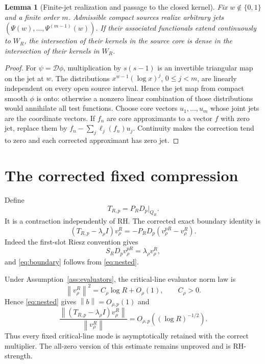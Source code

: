 \documentclass[11pt]{article}
\newtheorem{lemma}[theorem]{Lemma}
\theoremstyle{remark}
\newcommand{\norm}[1]{\left\lVert #1\right\rVert}
\begin{document}
\begin{lemma}[Finite-jet realization and passage to the closed kernel]\label{lem:jet-density}
Fix $w\notin\{0,1\}$ and a finite order $m$. Admissible compact sources
realize arbitrary jets $(\Psi(w),\ldots,\Psi^{(m-1)}(w))$.
If their associated functionals extend continuously to $W_R$, the
intersection of their kernels in the source core is dense in the
intersection of their kernels in $W_R$.
\end{lemma}
\begin{proof}
For $\psi=\mathcal D\phi$, multiplication by $s(s-1)$ is an invertible
triangular map on the jet at $w$. The distributions
$x^{w-1}(\log x)^j$, $0\le j<m$, are linearly independent on every open
source interval. Hence the jet map from compact smooth $\phi$ is onto:
otherwise a nonzero linear combination of those distributions would
annihilate all test functions. Choose core vectors $u_1,\ldots,u_m$
whose joint jets are the coordinate vectors. If $f_n$ are core
approximants to a vector $f$ with zero jet, replace them by
$f_n-\sum_j\ell_j(f_n)u_j$. Continuity makes the correction tend to zero
and each corrected approximant has zero jet.
\end{proof}


\section{The corrected fixed compression}
Define
\[
 T_{R,p}=P_RD_p\big|_{Q_R}.
\]
It is a contraction independently of RH. The corrected exact boundary identity is
\begin{equation}\label{eq:boundary}
 (T_{R,p}-\lambda_\rho I)v_\rho^R
 =-P_RD_p(v_\rho^{pR}-v_\rho^R).
\end{equation}
Indeed the first-slot Riesz convention gives
\[
 S_RD_pv_\rho^{pR}=\lambda_\rho v_\rho^R,
\]
and \eqref{eq:boundary} follows from \eqref{eq:nested}.

Under Assumption~\ref{ass:evaluators}, the critical-line evaluator norm law is
\[
 \norm{v_\rho^R}^2=C_\rho\log R+O_\rho(1),\qquad C_\rho>0.
\]
Hence \eqref{eq:nested} gives $\norm b=O_{\rho,p}(1)$ and
\begin{equation}\label{eq:criticalrate}
 \frac{\norm{(T_{R,p}-\lambda_\rho I)v_\rho^R}}{\norm{v_\rho^R}}
 =O_{\rho,p}((\log R)^{-1/2}).
\end{equation}
Thus every fixed critical-line mode is asymptotically retained with the correct multiplier. The all-zero version of this estimate remains unproved and is RH-strength.
\end{document}
